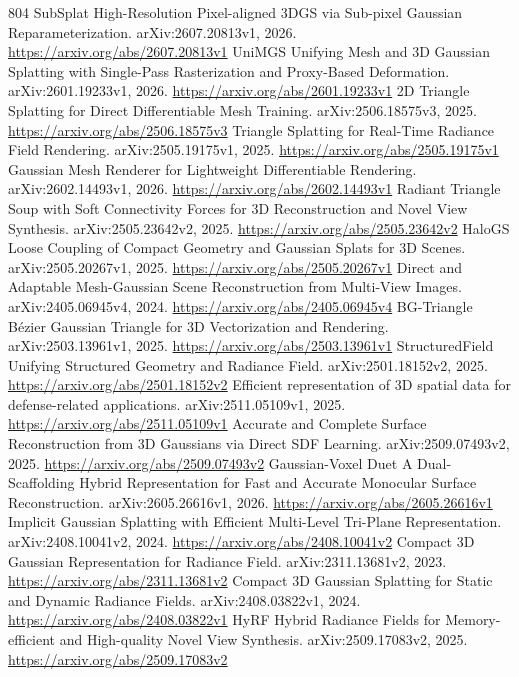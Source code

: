 \documentclass[11pt]{article}
\begin{document}
\begin{thebibliography}{804}
 SubSplat High-Resolution Pixel-aligned 3DGS via Sub-pixel Gaussian Reparameterization. arXiv:2607.20813v1, 2026. \url{https://arxiv.org/abs/2607.20813v1}
 UniMGS Unifying Mesh and 3D Gaussian Splatting with Single-Pass Rasterization and Proxy-Based Deformation. arXiv:2601.19233v1, 2026. \url{https://arxiv.org/abs/2601.19233v1}
 2D Triangle Splatting for Direct Differentiable Mesh Training. arXiv:2506.18575v3, 2025. \url{https://arxiv.org/abs/2506.18575v3}
 Triangle Splatting for Real-Time Radiance Field Rendering. arXiv:2505.19175v1, 2025. \url{https://arxiv.org/abs/2505.19175v1}
 Gaussian Mesh Renderer for Lightweight Differentiable Rendering. arXiv:2602.14493v1, 2026. \url{https://arxiv.org/abs/2602.14493v1}
 Radiant Triangle Soup with Soft Connectivity Forces for 3D Reconstruction and Novel View Synthesis. arXiv:2505.23642v2, 2025. \url{https://arxiv.org/abs/2505.23642v2}
 HaloGS Loose Coupling of Compact Geometry and Gaussian Splats for 3D Scenes. arXiv:2505.20267v1, 2025. \url{https://arxiv.org/abs/2505.20267v1}
 Direct and Adaptable Mesh-Gaussian Scene Reconstruction from Multi-View Images. arXiv:2405.06945v4, 2024. \url{https://arxiv.org/abs/2405.06945v4}
 BG-Triangle Bézier Gaussian Triangle for 3D Vectorization and Rendering. arXiv:2503.13961v1, 2025. \url{https://arxiv.org/abs/2503.13961v1}
 StructuredField Unifying Structured Geometry and Radiance Field. arXiv:2501.18152v2, 2025. \url{https://arxiv.org/abs/2501.18152v2}
 Efficient representation of 3D spatial data for defense-related applications. arXiv:2511.05109v1, 2025. \url{https://arxiv.org/abs/2511.05109v1}
 Accurate and Complete Surface Reconstruction from 3D Gaussians via Direct SDF Learning. arXiv:2509.07493v2, 2025. \url{https://arxiv.org/abs/2509.07493v2}
 Gaussian-Voxel Duet A Dual-Scaffolding Hybrid Representation for Fast and Accurate Monocular Surface Reconstruction. arXiv:2605.26616v1, 2026. \url{https://arxiv.org/abs/2605.26616v1}
 Implicit Gaussian Splatting with Efficient Multi-Level Tri-Plane Representation. arXiv:2408.10041v2, 2024. \url{https://arxiv.org/abs/2408.10041v2}
 Compact 3D Gaussian Representation for Radiance Field. arXiv:2311.13681v2, 2023. \url{https://arxiv.org/abs/2311.13681v2}
 Compact 3D Gaussian Splatting for Static and Dynamic Radiance Fields. arXiv:2408.03822v1, 2024. \url{https://arxiv.org/abs/2408.03822v1}
 HyRF Hybrid Radiance Fields for Memory-efficient and High-quality Novel View Synthesis. arXiv:2509.17083v2, 2025. \url{https://arxiv.org/abs/2509.17083v2}

\end{thebibliography}
\end{document}
